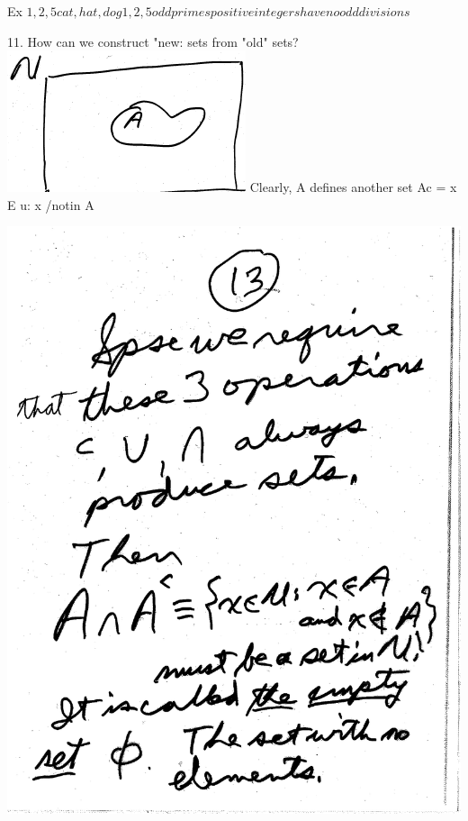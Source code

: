 \documentclass[10pt,a4paper]{article}
\begin{document}
\newpage

Ex ${1, 2, 5} {cat, hat, dog}
{{1, 2}, 5}
{odd primes}
{positive integers have no odd divisions}$

\vspace{.20 in}

\newpage

11. How can we construct "new: sets from "old" sets?
\includegraphics[scale=.5]{Pages/MathPicture}
Clearly, A defines another set A{c} = {x E u: x /notin A}


\includegraphics[scale=.5]{Pages/Page_13}
\end{document}
